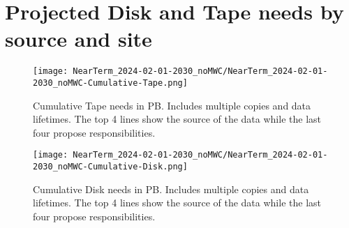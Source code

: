 \section{Projected Disk and Tape needs by source and site}
\begin{figure}[h]
\centering\texttt{[image: NearTerm\_2024-02-01-2030\_noMWC/NearTerm\_2024-02-01-2030\_noMWC-Cumulative-Tape.png]}
\caption{Cumulative Tape needs in PB. Includes multiple copies and data lifetimes. The top 4 lines show the source of the data while the last four propose responsibilities.}
\label{fig:Cumulative-Tape}
\end{figure}
\begin{figure}[h]
\centering\texttt{[image: NearTerm\_2024-02-01-2030\_noMWC/NearTerm\_2024-02-01-2030\_noMWC-Cumulative-Disk.png]}
\caption{Cumulative Disk needs in PB. Includes multiple copies and data lifetimes. The top 4 lines show the source of the data while the last four propose responsibilities.}
\label{fig:Cumulative-Disk}
\end{figure}

